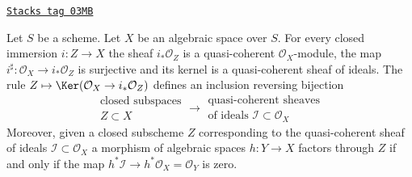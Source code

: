 \begin{lemma}
\label{spaces-morphisms-lemma-closed-immersion-ideals}
\href{https://stacks.math.columbia.edu/tag/03MB}{\texttt{Stacks tag 03MB}}

Let $S$ be a scheme.
Let $X$ be an algebraic space over $S$.
For every closed immersion $i : Z \to X$ the sheaf
$i_*\mathcal{O}_Z$ is a quasi-coherent $\mathcal{O}_X$-module, the map
$i^\sharp : \mathcal{O}_X \to i_*\mathcal{O}_Z$ is surjective and its
kernel is a quasi-coherent sheaf of ideals. The rule
$Z \mapsto \Ker(\mathcal{O}_X \to i_*\mathcal{O}_Z)$
defines an inclusion reversing bijection
$$
\begin{matrix}
\text{closed subspaces}\\
Z \subset X
\end{matrix}
\longrightarrow
\begin{matrix}
\text{quasi-coherent sheaves}\\
\text{of ideals }\mathcal{I} \subset \mathcal{O}_X
\end{matrix}
$$
Moreover, given a closed subscheme $Z$ corresponding to the quasi-coherent
sheaf of ideals $\mathcal{I} \subset \mathcal{O}_X$ a morphism of algebraic
spaces $h : Y \to X$ factors through $Z$ if and only if the map
$h^*\mathcal{I} \to h^*\mathcal{O}_X = \mathcal{O}_Y$ is zero.
\end{lemma}

